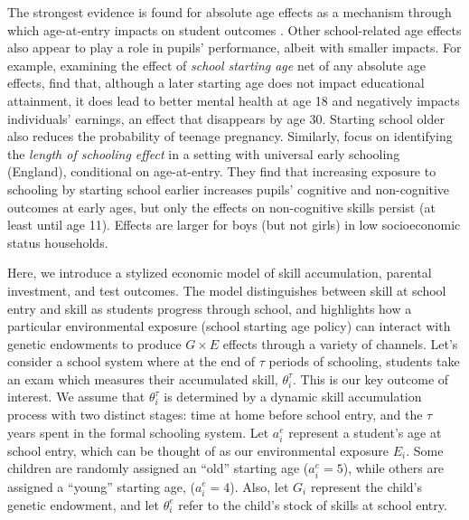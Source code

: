 \documentclass[12pt,a4paper]{article}
\begin{document}
\begin{bibunit}
The strongest evidence is found for absolute age effects as a mechanism through which age-at-entry impacts on student outcomes \citep{Crawford2010,Black2011}. Other school-related age effects also appear to play a role in pupils' performance, albeit with smaller impacts. For example, examining the effect of \textit{school starting age} net of any absolute age effects, \cite{Black2011} find that, although a later starting age does not impact educational attainment, it does lead to better mental health at age 18 and negatively impacts individuals' earnings, an effect that disappears by age 30. Starting school older also reduces the probability of teenage pregnancy. Similarly, \cite{cornelissen2019early}  focus on identifying the \textit{length of schooling effect} in a setting with universal early schooling (England), conditional on age-at-entry. They find that increasing exposure to schooling by starting school earlier increases pupils' cognitive and non-cognitive outcomes at early ages, but only the effects on non-cognitive skills persist (at least until age 11). Effects are larger for boys (but not girls) in low socioeconomic status households. 

Here, we introduce a stylized economic model of skill accumulation, parental investment, and test outcomes.  The model distinguishes between skill at school entry and skill as students progress through school, and highlights how a particular environmental exposure (school starting age policy) can interact with genetic endowments to produce $G \times E$ effects through a variety of channels.  Let's consider a school system where at the end of $\tau$ periods of schooling, students take an exam which measures their accumulated skill, $\theta_{i}^{\tau}$.  This is our key outcome of interest.  We assume that $\theta_{i}^{\tau}$ is determined by a dynamic skill accumulation process with two distinct stages: time at home before school entry, and the $\tau$ years spent in the formal schooling system.  Let $a_{i}^{e}$ represent a student's age at school entry, which can be thought of as our environmental exposure $E_{i}$. Some children are randomly assigned an ``old'' starting age ($a_{i}^{e}=5$), while others are assigned a ``young'' starting age, ($a_{i}^{e}=4$).  Also, let $G_{i}$ represent the child's genetic endowment, and let $\theta_i^e$ refer to the child's stock of skills at school entry.


\end{bibunit}
\end{document}
